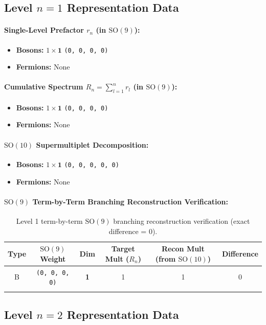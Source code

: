 \documentclass[11pt,a4paper]{article}
\begin{document}
\subsection{Level $n = 1$ Representation Data}
\paragraph{Single-Level Prefactor $r_n$ (in $\mathrm{SO}(9)$):}
\begin{itemize}
    \item \textbf{Bosons:} $1 \times \mathbf{1}$ \texttt{(0, 0, 0, 0)}
    \item \textbf{Fermions:} None
\end{itemize}
\paragraph{Cumulative Spectrum $R_n = \sum_{l=1}^n r_l$ (in $\mathrm{SO}(9)$):}
\begin{itemize}
    \item \textbf{Bosons:} $1 \times \mathbf{1}$ \texttt{(0, 0, 0, 0)}
    \item \textbf{Fermions:} None
\end{itemize}
\paragraph{$\mathrm{SO}(10)$ Supermultiplet Decomposition:}
\begin{itemize}
    \item \textbf{Bosons:} $1 \times \mathbf{1}$ \texttt{(0, 0, 0, 0, 0)}
    \item \textbf{Fermions:} None
\end{itemize}
\paragraph{$\mathrm{SO}(9)$ Term-by-Term Branching Reconstruction Verification:}
\begin{longtable}{@{}cccccc@{}}
\toprule
Type & $\mathrm{SO}(9)$ Weight & Dim & Target Mult ($R_n$) & Recon Mult (from $\mathrm{SO}(10)$) & Difference \\
\midrule
\endhead
B & \texttt{(0, 0, 0, 0)} & \textbf{1} & 1 & 1 & 0 \\
\bottomrule
\caption{Level 1 term-by-term $\mathrm{SO}(9)$ branching reconstruction verification (exact difference = 0).}
\end{longtable}

\subsection{Level $n = 2$ Representation Data}
\end{document}
